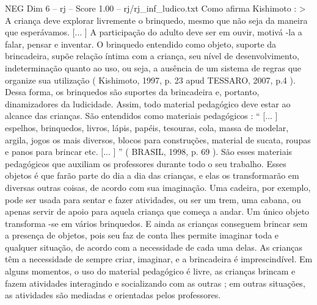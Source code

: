 \begin{textsample}{NEG Dim 6 – rj – Score 1.00 – rj/rj\_inf\_ludico.txt}
Como afirma Kishimoto : > A criança deve explorar livremente o brinquedo, mesmo que não seja da maneira que esperávamos. [... ] A participação do adulto deve ser em ouvir, motivá -la a falar, pensar e inventar.
O brinquedo entendido como objeto, suporte da brincadeira, supõe relação íntima com a criança, seu nível de desenvolvimento, indeterminação quanto ao uso, ou seja, a ausência de um sistema de regras que organize sua utilização ( Kishimoto, 1997, p. 23 apud TESSARO, 2007, p.4 ).
Dessa forma, os brinquedos são suportes da brincadeira e, portanto, dinamizadores da ludicidade.
Assim, todo material pedagógico deve estar ao alcance das crianças.
São entendidos como materiais pedagógicos : “ [... ] espelhos, brinquedos, livros, lápis, papéis, tesouras, cola, massa de modelar, argila, jogos os mais diversos, blocos para construções, material de sucata, roupas e panos para brincar etc. [... ] ” ( BRASIL, 1998, p. 69 ).
São esses materiais pedagógicos que auxiliam os professores durante todo o seu trabalho.
Esses objetos é que farão parte do dia a dia das crianças, e elas os transformarão em diversas outras coisas, de acordo com sua imaginação.
Uma cadeira, por exemplo, pode ser usada para sentar e fazer atividades, ou ser um trem, uma cabana, ou apenas servir de apoio para aquela criança que começa a andar.
Um único objeto transforma -se em vários brinquedos.
E ainda as crianças conseguem brincar sem a presença de objetos, pois seu faz de conta lhes permite imaginar toda e qualquer situação, de acordo com a necessidade de cada uma delas.
As crianças têm a necessidade de sempre criar, imaginar, e a brincadeira é imprescindível.
Em alguns momentos, o uso do material pedagógico é livre, as crianças brincam e fazem atividades interagindo e socializando com as outras ; em outras situações, as atividades são mediadas e orientadas pelos professores.

\end{textsample}
